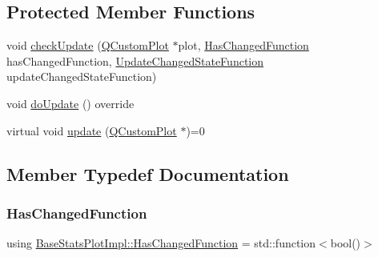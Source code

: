 \subsection*{Protected Member Functions}
\begin{DoxyCompactItemize}
\item 
void \mbox{\hyperlink{class_base_stats_plot_impl_add1e42def057442b4198158e003ae226}{check\+Update}} (\mbox{\hyperlink{class_q_custom_plot}{Q\+Custom\+Plot}} $\ast$plot, \mbox{\hyperlink{class_base_stats_plot_impl_a948f49df97d1bd9824b08d6aeb83b3c7}{Has\+Changed\+Function}} has\+Changed\+Function, \mbox{\hyperlink{class_base_stats_plot_impl_a906285829f153a9f28fb245213a2916a}{Update\+Changed\+State\+Function}} update\+Changed\+State\+Function)
\item 
void \mbox{\hyperlink{class_base_stats_plot_impl_a10523764ddeab4cc171b05daf3e7acaf}{do\+Update}} () override
\item 
virtual void \mbox{\hyperlink{class_base_stats_plot_impl_aa483fe8053767302195bb82bf9a3d7fb}{update}} (\mbox{\hyperlink{class_q_custom_plot}{Q\+Custom\+Plot}} $\ast$)=0
\end{DoxyCompactItemize}


\subsection{Member Typedef Documentation}
\mbox{\label{class_base_stats_plot_impl_a948f49df97d1bd9824b08d6aeb83b3c7}} 
\subsubsection{\texorpdfstring{HasChangedFunction}{HasChangedFunction}}
{\footnotesize\ttfamily using \mbox{\hyperlink{class_base_stats_plot_impl_a948f49df97d1bd9824b08d6aeb83b3c7}{Base\+Stats\+Plot\+Impl\+::\+Has\+Changed\+Function}} =  std\+::function$<$bool()$>$\hspace{0.3cm}{\ttfamily [protected]}}

\mbox{\label{class_base_stats_plot_impl_a906285829f153a9f28fb245213a2916a}} 
